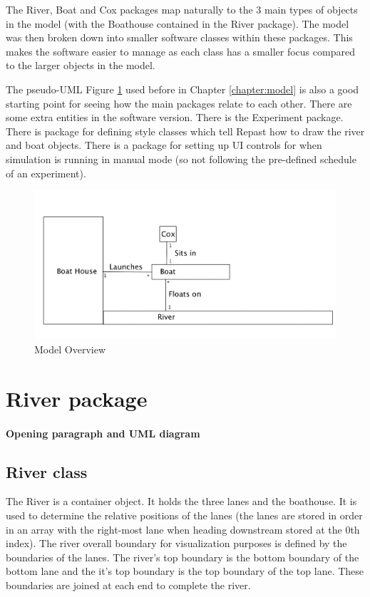The River, Boat and Cox packages map
naturally to the 3 main types of objects in the model (with the
Boathouse contained in the River package). The model was
then broken down into smaller software classes within these packages. This
makes the software easier to manage as each class has a smaller focus
compared to the larger objects in the model.

The pseudo-UML Figure \ref{software:fig:modeloverview} used before in Chapter \ref{chapter:model} is also a
good starting point for seeing how the main packages relate to each
other. There are some extra entities in the software version. There
is the Experiment package. There is package for defining style
classes which tell Repast how to draw the river and boat
objects. There is a package for setting up UI controls for when
simulation is running in manual mode (so not following the
pre-defined schedule of an experiment).

\begin{figure}
\begin{center}
  \includegraphics[scale=0.3]{images/ModelOverview.png}
  \caption{Model Overview}
  \label{software:fig:modeloverview}
\end{center}
\end{figure}



\section{River package}
\paragraph{Opening paragraph and UML diagram}

\subsection{River class}
The River is a container object. It holds the three lanes and the
boathouse. It is used to determine the relative positions of the lanes
(the lanes are stored in order in an array with the right-most lane when
heading downstream stored at the 0th index). The river overall
boundary for visualization purposes is defined by the boundaries of
the lanes. The river's top boundary is the bottom boundary of
the bottom lane and the it's top boundary is the top boundary
of the top lane. These boundaries are joined at each end to
complete the river.

